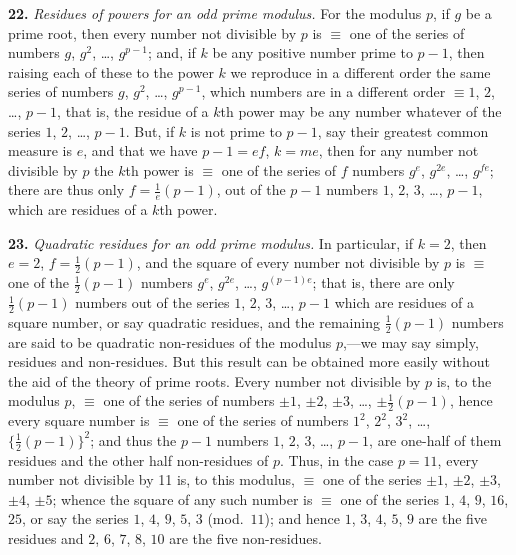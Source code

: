 \documentclass[11pt,a4paper]{book}
\begin{document}
\textbf{22.}\quad
\textit{Residues of powers for an odd prime modulus.} For the modulus $p$, if $g$ be a prime root, then every number not divisible by $p$ is $\equiv$ one of the series of numbers $g$, $g^{2}$, \ldots, $g^{p-1}$; and, if $k$ be any positive number prime to $p - 1$, then raising each of these to the power $k$ we reproduce in a different order the same series of numbers $g$, $g^{2}$, \ldots, $g^{p-1}$, which numbers are in a different order $\equiv 1$, $2$, \ldots, $p - 1$, that is, the residue of a $k$th power may be any number whatever of the series $1$, $2$, \ldots, $p - 1$. But, if $k$ is not prime to $p - 1$, say their greatest common measure is $e$, and that we have $p - 1 = ef$, $k = me$, then for any number not divisible by $p$ the $k$th power is $\equiv$ one of the series of $f$ numbers $g^{e}$, $g^{2e}$, \ldots, $g^{fe}$; there are thus only $f = \frac{1}{e}(p - 1)$, out of the $p - 1$ numbers $1$, $2$, $3$, \ldots, $p - 1$, which are residues of a $k$th power.

\textbf{23.}\quad
\textit{Quadratic residues for an odd prime modulus.} In particular, if $k = 2$, then $e = 2$, $f = \frac{1}{2}(p - 1)$, and the square of every number not divisible by $p$ is $\equiv$ one of the $\frac{1}{2}(p - 1)$ numbers $g^{e}$, $g^{2e}$, \ldots, $g^{(p-1)e}$; that is, there are only $\frac{1}{2}(p - 1)$ numbers out of the series $1$, $2$, $3$, \ldots, $p - 1$ which are residues of a square number, or say quadratic residues, and the remaining $\frac{1}{2}(p - 1)$ numbers are said to be quadratic non-residues of the modulus $p$,---we may say simply, residues and non-residues. But this result can be obtained more easily without the aid of the theory of prime roots. Every number not divisible by $p$ is, to the modulus $p$, $\equiv$ one of the series of numbers $\pm 1$, $\pm 2$, $\pm 3$, \ldots, $\pm \frac{1}{2}(p - 1)$, hence every square number is $\equiv$ one of the series of numbers $1^{2}$, $2^{2}$, $3^{2}$, \ldots, $\{\frac{1}{2}(p - 1)\}^{2}$; and thus the $p - 1$ numbers $1$, $2$, $3$, \ldots, $p - 1$, are one-half of them residues and the other half non-residues of $p$. Thus, in the case $p = 11$, every number not divisible by 11 is, to this modulus, $\equiv$ one of the series $\pm 1$, $\pm 2$, $\pm 3$, $\pm 4$, $\pm 5$; whence the square of any such number is $\equiv$ one of the series $1$, $4$, $9$, $16$, $25$, or say the series $1$, $4$, $9$, $5$, $3$ (mod.\ $11$); and hence $1$, $3$, $4$, $5$, $9$ are the five residues and $2$, $6$, $7$, $8$, $10$ are the five non-residues.
\end{document}
